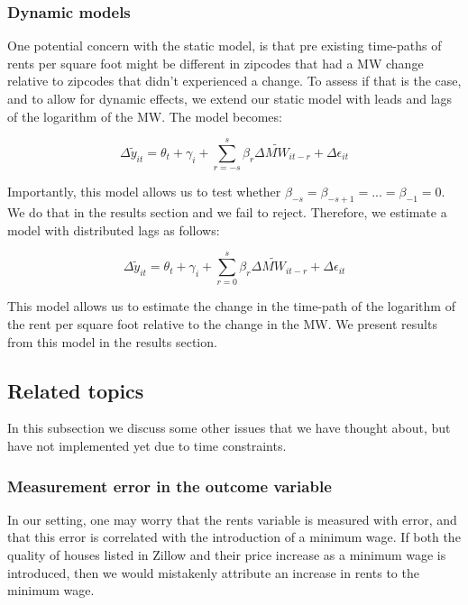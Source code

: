 \subsubsection{Dynamic models}

One potential concern with the static model, is that pre existing time-paths of rents per square foot might be different in zipcodes that had a MW change relative to zipcodes that didn't experienced a change. To assess if that is the case, and to allow for dynamic effects, we extend our static model with leads and lags of the logarithm of the MW. The model becomes:

\begin{equation}\label{eq:diff_main}
        \Delta \tilde{y}_{it} = \theta_t + \gamma_i + \sum_{r=-s}^{s}\beta_r \Delta \tilde{MW}_{it-r}+ \Delta \epsilon_{it}
\end{equation}

Importantly, this model allows us to test whether $\beta_{-s} = \beta_{-s+1} = ... = \beta_{-1} = 0$. We do that in the results section and we fail to reject. Therefore, we estimate a model with distributed lags as follows:

\begin{equation}\label{eq:diff_main}
        \Delta \tilde{y}_{it} = \theta_t + \gamma_i + \sum_{r=0}^{s}\beta_r \Delta \tilde{MW}_{it-r}+ \Delta \epsilon_{it}
\end{equation}

This model allows us to estimate the change in the time-path of the logarithm of the rent per square foot relative to the change in the MW. We present results from this model in the results section. 

\subsection{Related topics} \label{subsec:empirical_strategy/related-topics}

    In this subsection we discuss some other issues that we have thought about, but have not implemented yet due to time constraints.

    \subsubsection{Measurement error in the outcome variable}

    In our setting, one may worry that the rents variable is measured with error, and that this error is correlated with the introduction of a minimum wage. If both the quality of houses listed in Zillow and their price increase as a minimum wage is introduced, then we would mistakenly attribute an increase in rents to the minimum wage.%
    
